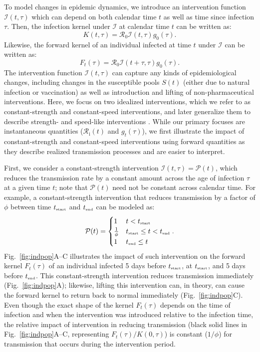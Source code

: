 \documentclass[12pt]{article}
\newcommand{\fref}[1]{Fig.~\ref{fig:#1}}
\newcommand{\Rx}[1]{\ensuremath{{\mathcal R}_{#1}}\xspace}
\newcommand{\Ro}{\Rx{0}}
\newcommand{\Ri}{\Rx{\mathrm{i}}}
\newcommand{\tsub}[2]{#1_{{\textrm{\tiny #2}}}}
\newcommand{\tstart}{\ensuremath{\tsub{t}{start}}\xspace}
\newcommand{\tend}{\ensuremath{\tsub{t}{end}}\xspace}
\newcommand{\PP}{\ensuremath{\mathcal P}}
\newcommand{\II}{\ensuremath{\mathcal I}}
\begin{document}
To model changes in epidemic dynamics, we introduce an intervention function $\II(t, \tau)$ which can depend on both calendar time $t$ as well as time since infection $\tau$. 
Then, the infection kernel under $\II$ at calendar time $t$ can be written as:
\begin{equation}
K(t, \tau) = \Ro \II(t, \tau) g_0(\tau).
\end{equation}
Likewise, the forward kernel of an individual infected at time $t$ under $\II$ can be written as:
\begin{equation}
F_t(\tau) =  \Ro \II(t + \tau, \tau) g_0(\tau).
\end{equation}
The intervention function $\II(t, \tau)$ can capture any kinds of epidemiological changes, including changes in the susceptible pools $S(t)$ (either due to natural infection or vaccination) as well as introduction and lifting of non-pharmaceutical interventions.
Here, we focus on two idealized interventions, which we refer to as constant-strength and constant-speed interventions, and later generalize them to describe strength- and speed-like interventions \citep{dushoff2021speed}.
While our primary focuses are instantaneous quantities ($\Ri(t)$ and $g_t(\tau)$), we first illustrate the impact of constant-strength and constant-speed interventions using forward quantities as they describe realized transmission processes and are easier to interpret.

First, we consider a constant-strength intervention $\II(t, \tau) = \PP(t)$, which reduces the transmission rate by a constant amount across the age of infection $\tau$ at a given time $t$; note that $\PP(t)$ need not be constant across calendar time.
For example, a constant-strength intervention that reduces transmission by a factor of $\phi$ between time \tstart and \tend can be modeled as:
\begin{equation}
\PP(t) = \begin{cases}
1 & t < \tstart\\
\frac{1}{\phi} & \tstart \leq t < \tend\\
1 & \tend \leq t
\end{cases}.
\end{equation}
\fref{indpop}A--C illustrates the impact of such intervention on the forward kernel $F_t(\tau)$ of an individual infected 5 days before $\tstart$, at $\tstart$, and 5 days before $\tend$.
This constant-strength intervention reduces transmission immediately (\fref{indpop}A);
likewise, lifting this intervention can, in theory, can cause the forward kernel to return back to normal immediately (\fref{indpop}C).
Even though the exact shape of the kernel $F_t(\tau)$ depends on the time of infection and when the intervention was introduced relative to the infection time, the relative impact of intervention in reducing transmission (black solid lines in \fref{indpop}A--C, representing $F_t(\tau)/K(0, \tau)$) is constant ($1/\phi$) for transmission that occurs during the intervention period.
\end{document}

